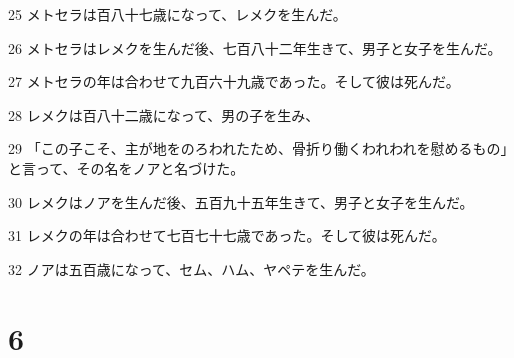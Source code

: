 \par 25 メトセラは百八十七歳になって、レメクを生んだ。
\par 26 メトセラはレメクを生んだ後、七百八十二年生きて、男子と女子を生んだ。
\par 27 メトセラの年は合わせて九百六十九歳であった。そして彼は死んだ。
\par 28 レメクは百八十二歳になって、男の子を生み、
\par 29 「この子こそ、主が地をのろわれたため、骨折り働くわれわれを慰めるもの」と言って、その名をノアと名づけた。
\par 30 レメクはノアを生んだ後、五百九十五年生きて、男子と女子を生んだ。
\par 31 レメクの年は合わせて七百七十七歳であった。そして彼は死んだ。
\par 32 ノアは五百歳になって、セム、ハム、ヤペテを生んだ。

\chapter{6}

